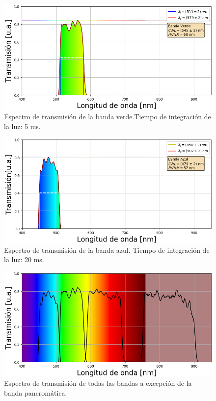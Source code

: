 \begin{figure}[H]
	\centering
	\includegraphics[width=1.0\textwidth]{Figs/microespectrometro/espectro_verdet.png}
	\caption{Espectro de transmisión de la banda verde.Tiempo de integración de la luz: 5 ms.}
	\label{fig:bverde}
\end{figure}
\begin{figure}[H]
	\centering
	\includegraphics[width=1.0\textwidth]{Figs/microespectrometro/espectro_azult.png}
	\caption{Espectro de transmisión de la banda azul. Tiempo de integración de la luz: 20 ms.}
	\label{fig:bazul}
\end{figure}

 \begin{figure}[H]
	\centering
	\includegraphics[width=1.0\textwidth]{Figs/microespectrometro/4bandas_conimshowT.png}
	\caption{Espectro de transmisión de todas las bandas a excepción de la banda pancromática.}
	\label{fig:batod}
\end{figure}

